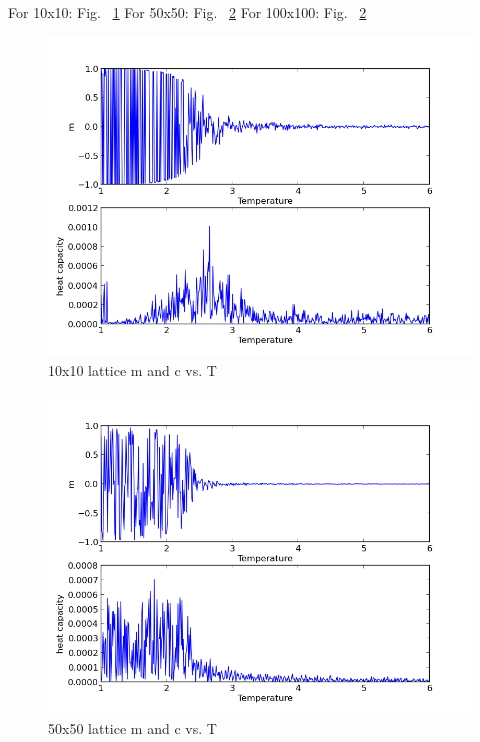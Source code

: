 \documentclass[11pt,letterpaper]{article}
\begin{document}
For 10x10: Fig. ~\ref{figure4}
For 50x50: Fig. ~\ref{figure5}
For 100x100: Fig. ~\ref{figure5}

\begin{figure}
\begin{center}
\includegraphics[width=0.8\linewidth,angle=0]{cp210.png}
\caption{10x10 lattice m and c vs. T}
\label{figure4}
\end{center}
\end{figure}


\begin{figure}
\begin{center}
\includegraphics[width=0.8\linewidth,angle=0]{cp250.png}
\caption{50x50 lattice m and c vs. T}
\label{figure5}
\end{center}
\end{figure}
\end{document}
